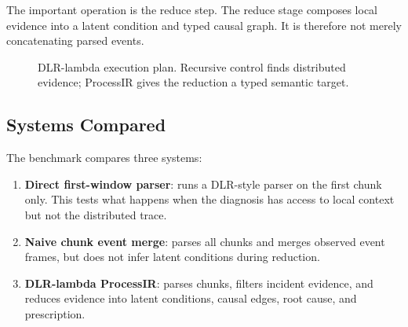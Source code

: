 \documentclass[11pt]{article}
\begin{document}
The important operation is the reduce step. The reduce stage composes local
evidence into a latent condition and typed causal graph. It is therefore not
merely concatenating parsed events.

\begin{figure}[h]
\centering
{}
\caption{DLR-lambda execution plan. Recursive control finds distributed evidence;
ProcessIR gives the reduction a typed semantic target.}
\end{figure}

\subsection{Systems Compared}

The benchmark compares three systems:

\begin{enumerate}
  \item \textbf{Direct first-window parser}: runs a DLR-style parser on the
  first chunk only. This tests what happens when the diagnosis has access to
  local context but not the distributed trace.
  \item \textbf{Naive chunk event merge}: parses all chunks and merges observed
  event frames, but does not infer latent conditions during reduction.
  \item \textbf{DLR-lambda ProcessIR}: parses chunks, filters incident evidence,
  and reduces evidence into latent conditions, causal edges, root cause, and
  prescription.
\end{enumerate}
\end{document}
